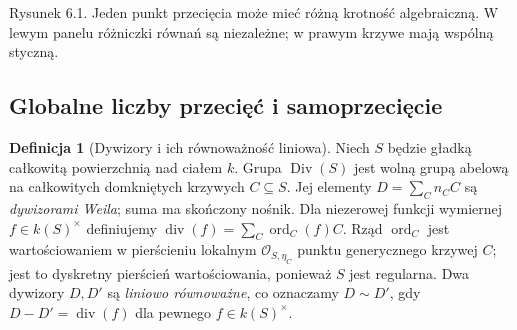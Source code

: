 \documentclass[11pt,a4paper,openany]{report}
\numberwithin{equation}{section}
\theoremstyle{plain}
\theoremstyle{definition}
\newtheorem{definicja}[twierdzenie]{Definicja}
\theoremstyle{remark}
\begin{document}
\begin{center}
\begin{minipage}{\linewidth}
\centering
{}

{\small Rysunek 6.1. Jeden punkt przecięcia może mieć różną krotność algebraiczną. W lewym panelu różniczki równań są niezależne; w prawym krzywe mają wspólną styczną.}\par
\end{minipage}
\end{center}

\subsection{Globalne liczby przecięć i samoprzecięcie}

\begin{definicja}[Dywizory i ich równoważność liniowa]
\label{def:ga6-divisor-group}
Niech $S$ będzie gładką całkowitą powierzchnią nad ciałem $k$.
Grupa $\operatorname{Div}(S)$ jest wolną grupą abelową na
całkowitych domkniętych krzywych $C\subseteq S$. Jej elementy
$D=\sum_C n_C C$ są \emph{dywizorami Weila}; suma ma skończony
nośnik. Dla niezerowej funkcji wymiernej $f\in k(S)^\times$
definiujemy $\operatorname{div}(f)=\sum_C\operatorname{ord}_C(f)C$.
Rząd $\operatorname{ord}_C$ jest wartościowaniem w pierścieniu lokalnym
$\mathcal O_{S,\eta_C}$ punktu generycznego krzywej $C$;
jest to dyskretny pierścień wartościowania, ponieważ $S$ jest
regularna. Dwa dywizory $D,D'$ są \emph{liniowo równoważne},
co oznaczamy $D\sim D'$, gdy $D-D'=\operatorname{div}(f)$
dla pewnego $f\in k(S)^\times$.
\end{definicja}
\end{document}
